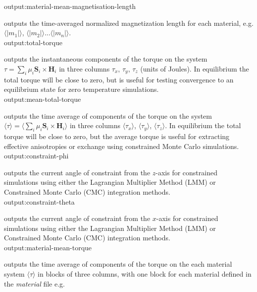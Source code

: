 {\zicf output:material-mean-magnetisation-length} outputs the time-averaged normalized magnetization length for each material, e.g. $\langle|m_1|\rangle$, $\langle|m_2|\rangle$...$\langle|m_n|\rangle$.\\

{\zicf output:total-torque} outputs the instantaneous components of the torque on the system $\tau = \sum_i \mu_i \mathbf{S}_i \times \mathbf{H}_i$ in three columns $\tau_x$, $\tau_y$, $\tau_z$ (units of Joules). In equilibrium the total torque will be close to zero, but is useful for testing convergence to an equilibrium state for zero temperature simulations.\\

{\zicf output:mean-total-torque} outputs the time average of components of the torque on the system $\langle\tau\rangle = \langle\sum_i \mu_i \mathbf{S}_i \times \mathbf{H}_i \rangle$ in three columns $\langle\tau_x \rangle$, $\langle\tau_y \rangle$, $\langle\tau_z \rangle$. In equilibrium the total torque will be close to zero, but the average torque is useful for extracting effective anisotropies or exchange using constrained Monte Carlo simulations.\\

{\zicf output:constraint-phi} outputs the current angle of constraint from the $z$-axis for constrained simulations using either the Lagrangian Multiplier Method (LMM) or Constrained Monte Carlo (CMC) integration methods.\\

{\zicf output:constraint-theta} outputs the current angle of constraint from the $x$-axis for constrained simulations using either the Lagrangian Multiplier Method (LMM) or Constrained Monte Carlo (CMC) integration methods.\\



{\zicf output:material-mean-torque} outputs the time average of components of the torque on the each material system $\langle\tau\rangle$ in blocks of three columns, with one block for each material defined in the \textit{material} file e.g.

